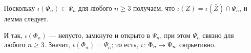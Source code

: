 \documentclass[oneside,a4paper]{article}
\begin{document}
Поскольку $\iota(\Phi_n)\subset \Psi_n$ для любого $n\ge 3$ получаем, что  $\iota (Z)=\iota(\bar Z)\cap \Psi_n$, и лемма следует. 

\medskip

И так, $\iota(\Phi_n)$ --- непусто, замкнуто и открыто в $\Psi_n$, при этом $\Psi_n$ связно для любого $n\ge 3$.
Значит, $\iota(\Phi_n)=\Psi_n$; то есть, $\iota\:\Phi_n\z\to\Psi_n$ сюрьетивно.
\qeds

\sloppy
\printbibliography[heading=bibintoc]
\fussy
\end{document}
